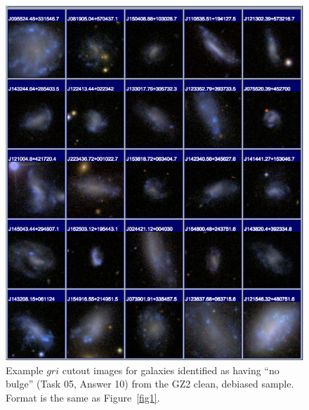 \documentclass[useAMS,usenatbib]{mn2e}
\begin{document}
\newpage
\clearpage
\begin{figure}
\includegraphics[angle=0,width=7.0in]{figures/gallery/nobulge.png}
\caption{Example $gri$ cutout images for galaxies identified as having ``no bulge'' (Task 05, Answer 10) from the GZ2 clean, debiased sample. Format is the same as Figure~\ref{fig1}.}
\end{figure}
\end{document}
